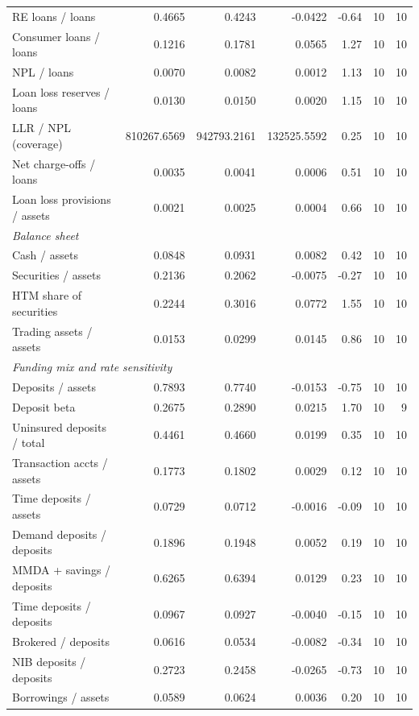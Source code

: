 \begin{tabular}{lrrrrrr}
RE loans / loans & 0.4665 & 0.4243 & -0.0422 & -0.64 & 10 & 10 \\
Consumer loans / loans & 0.1216 & 0.1781 & 0.0565 & 1.27 & 10 & 10 \\
NPL / loans & 0.0070 & 0.0082 & 0.0012 & 1.13 & 10 & 10 \\
Loan loss reserves / loans & 0.0130 & 0.0150 & 0.0020 & 1.15 & 10 & 10 \\
LLR / NPL (coverage) & 810267.6569 & 942793.2161 & 132525.5592 & 0.25 & 10 & 10 \\
Net charge-offs / loans & 0.0035 & 0.0041 & 0.0006 & 0.51 & 10 & 10 \\
Loan loss provisions / assets & 0.0021 & 0.0025 & 0.0004 & 0.66 & 10 & 10 \\
\midrule
\multicolumn{7}{l}{\emph{Balance sheet}} \\
\midrule
Cash / assets & 0.0848 & 0.0931 & 0.0082 & 0.42 & 10 & 10 \\
Securities / assets & 0.2136 & 0.2062 & -0.0075 & -0.27 & 10 & 10 \\
HTM share of securities & 0.2244 & 0.3016 & 0.0772 & 1.55 & 10 & 10 \\
Trading assets / assets & 0.0153 & 0.0299 & 0.0145 & 0.86 & 10 & 10 \\
\midrule
\multicolumn{7}{l}{\emph{Funding mix and rate sensitivity}} \\
\midrule
Deposits / assets & 0.7893 & 0.7740 & -0.0153 & -0.75 & 10 & 10 \\
Deposit beta & 0.2675 & 0.2890 & 0.0215 & 1.70 & 10 & 9 \\
Uninsured deposits / total & 0.4461 & 0.4660 & 0.0199 & 0.35 & 10 & 10 \\
Transaction accts / assets & 0.1773 & 0.1802 & 0.0029 & 0.12 & 10 & 10 \\
Time deposits / assets & 0.0729 & 0.0712 & -0.0016 & -0.09 & 10 & 10 \\
Demand deposits / deposits & 0.1896 & 0.1948 & 0.0052 & 0.19 & 10 & 10 \\
MMDA + savings / deposits & 0.6265 & 0.6394 & 0.0129 & 0.23 & 10 & 10 \\
Time deposits / deposits & 0.0967 & 0.0927 & -0.0040 & -0.15 & 10 & 10 \\
Brokered / deposits & 0.0616 & 0.0534 & -0.0082 & -0.34 & 10 & 10 \\
NIB deposits / deposits & 0.2723 & 0.2458 & -0.0265 & -0.73 & 10 & 10 \\
Borrowings / assets & 0.0589 & 0.0624 & 0.0036 & 0.20 & 10 & 10 \\

\end{tabular}
